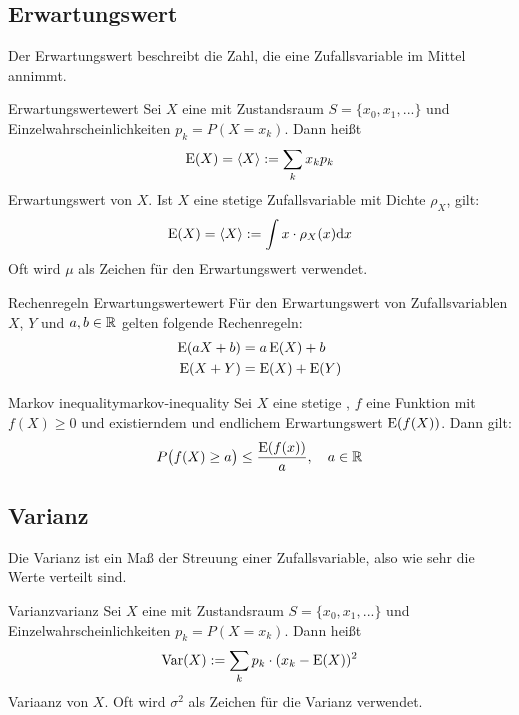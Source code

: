 \subsection{Erwartungswert}

Der Erwartungswert beschreibt die Zahl, die eine Zufallsvariable im Mittel
annimmt.

\begin{definition}{Erwartungswert}{ewert}
Sei $X$ eine  mit Zustandsraum $S=\{x_0, x_1,
...\}$ und Einzelwahrscheinlichkeiten $p_k=P(X=x_k)$. Dann heißt
\[
\operatorname{E}(X) =\langle X\rangle := \sum_k x_kp_k
\]
Erwartungswert von $X$. Ist $X$ eine stetige Zufallsvariable mit Dichte
$\rho_X$, gilt:
\[
\operatorname{E}(X) =\langle X\rangle := \int x\cdot\rho_X(x)\mathrm{d}x
\]
Oft wird $\mu$ als Zeichen für den Erwartungswert verwendet.
\end{definition}

\begin{theorem}{Rechenregeln Erwartungswert}{ewert}
Für den Erwartungswert von Zufallsvariablen $X$, $Y$ und $a,b\in\mathbb{R}$ gelten
folgende Rechenregeln:
\begin{align*}
\operatorname{E}(aX+b) &= a\operatorname{E}(X) + b \\
\operatorname{E}(X+Y) &= \operatorname{E}(X) + \operatorname{E}(Y)
\end{align*}
\end{theorem}

\begin{theorem}{Markov inequality}{markov-inequality}
Sei $X$ eine stetige , $f$ eine Funktion mit
$f(X)\ge 0$ und existierndem und endlichem Erwartungswert $\operatorname{E}(f(X))$. Dann gilt:
\[
P\big(f(X)\ge a\big)\le \frac{\operatorname{E}(f(x))}{a},\quad a\in\mathbb{R}
\]
\end{theorem}


\subsection{Varianz}

Die Varianz ist ein Maß der Streuung einer Zufallsvariable, also wie sehr die
Werte verteilt sind.

\begin{definition}{Varianz}{varianz}
Sei $X$ eine  mit Zustandsraum $S=\{x_0, x_1,
...\}$ und Einzelwahrscheinlichkeiten $p_k=P(X=x_k)$. Dann heißt
\[
\operatorname{Var}(X) := \sum_k p_k\cdot(x_k - \operatorname{E}(X))^2
\]
Variaanz von $X$. Oft wird $\sigma^2$ als Zeichen für die Varianz verwendet.
\end{definition}

